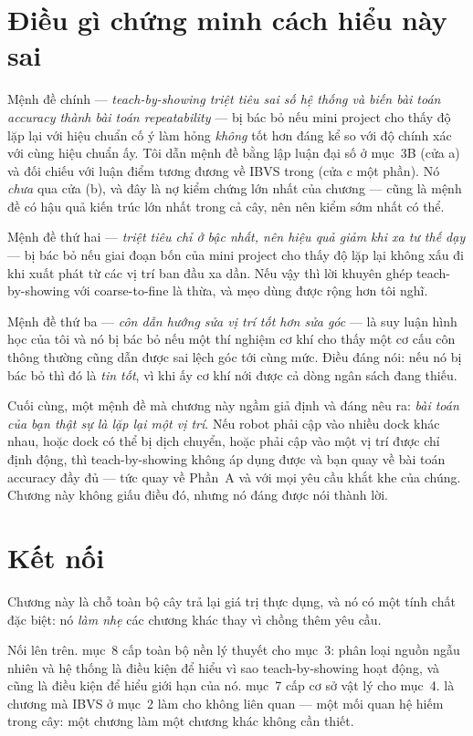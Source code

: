 \documentclass[../../marker.tex]{subfiles}
\begin{document}
\section{Điều gì chứng minh cách hiểu này sai}

Mệnh đề chính --- \emph{teach-by-showing triệt tiêu sai số hệ thống và biến bài toán accuracy thành bài toán repeatability} --- bị bác bỏ nếu mini project cho thấy độ lặp lại với hiệu chuẩn cố ý làm hỏng \emph{không} tốt hơn đáng kể so với độ chính xác với cùng hiệu chuẩn ấy. Tôi dẫn mệnh đề bằng lập luận đại số ở mục~3B (cửa a) và đối chiếu với luận điểm tương đương về IBVS trong \cite{espiau1992new} (cửa c một phần). Nó \emph{chưa} qua cửa (b), và đây là nợ kiểm chứng lớn nhất của chương --- cũng là mệnh đề có hậu quả kiến trúc lớn nhất trong cả cây, nên nên kiểm sớm nhất có thể.

Mệnh đề thứ hai --- \emph{triệt tiêu chỉ ở bậc nhất, nên hiệu quả giảm khi xa tư thế dạy} --- bị bác bỏ nếu giai đoạn bốn của mini project cho thấy độ lặp lại không xấu đi khi xuất phát từ các vị trí ban đầu xa dần. Nếu vậy thì lời khuyên ghép teach-by-showing với coarse-to-fine là thừa, và mẹo dùng được rộng hơn tôi nghĩ.

Mệnh đề thứ ba --- \emph{côn dẫn hướng sửa vị trí tốt hơn sửa góc} --- là suy luận hình học của tôi và nó bị bác bỏ nếu một thí nghiệm cơ khí cho thấy một cơ cấu côn thông thường cũng dẫn được sai lệch góc tới cùng mức. Điều đáng nói: nếu nó bị bác bỏ thì đó là \emph{tin tốt}, vì khi ấy cơ khí nới được cả dòng ngân sách đang thiếu.

Cuối cùng, một mệnh đề mà chương này ngầm giả định và đáng nêu ra: \emph{bài toán của bạn thật sự là lặp lại một vị trí}. Nếu robot phải cập vào nhiều dock khác nhau, hoặc dock có thể bị dịch chuyển, hoặc phải cập vào một vị trí được chỉ định động, thì teach-by-showing không áp dụng được và bạn quay về bài toán accuracy đầy đủ --- tức quay về Phần~A và  với mọi yêu cầu khắt khe của chúng. Chương này không giấu điều đó, nhưng nó đáng được nói thành lời.

\section{Kết nối}

Chương này là chỗ toàn bộ cây trả lại giá trị thực dụng, và nó có một tính chất đặc biệt: nó \emph{làm nhẹ} các chương khác thay vì chồng thêm yêu cầu.

Nối lên trên.  mục~8 cấp toàn bộ nền lý thuyết cho mục~3: phân loại nguồn ngẫu nhiên và hệ thống là điều kiện để hiểu vì sao teach-by-showing hoạt động, và cũng là điều kiện để hiểu giới hạn của nó.  mục~7 cấp cơ sở vật lý cho mục~4.  là chương mà IBVS ở mục~2 làm cho không liên quan --- một mối quan hệ hiếm trong cây: một chương làm một chương khác không cần thiết.
\end{document}
